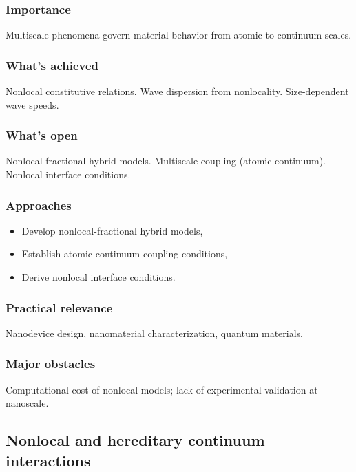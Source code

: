 \subsubsection{Importance}

Multiscale phenomena govern material behavior from atomic to continuum scales.

\subsubsection{What's achieved}

Nonlocal constitutive relations. Wave dispersion from nonlocality. Size-dependent wave speeds.

\subsubsection{What's open}

Nonlocal-fractional hybrid models. Multiscale coupling (atomic-continuum). Nonlocal interface conditions.

\subsubsection{Approaches}

\begin{itemize}
\item Develop nonlocal-fractional hybrid models,
\item Establish atomic-continuum coupling conditions,
\item Derive nonlocal interface conditions.
\end{itemize}

\subsubsection{Practical relevance}

Nanodevice design, nanomaterial characterization, quantum materials.

\subsubsection{Major obstacles}

Computational cost of nonlocal models; lack of experimental validation at nanoscale.

\subsection{Nonlocal and hereditary continuum interactions}
\label{sec:16.4}

